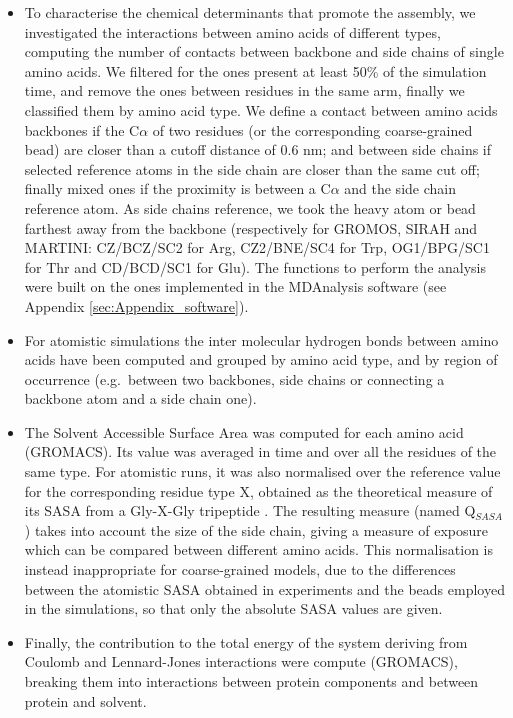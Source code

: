 \begin{itemize}
\item To characterise the chemical determinants that promote the assembly, we investigated the interactions between amino acids of different types, computing the number of contacts between backbone and side chains of single amino acids. We filtered for the ones present at least 50\% of the simulation time, and remove the ones between residues in the same arm, finally we classified them by amino acid type.
%
We define a contact between amino acids backbones if the C$\alpha$ of two residues (or the corresponding coarse-grained bead) are closer than a cutoff distance of 0.6 nm; and between side chains if selected reference atoms in the side chain are closer than the same cut off; finally mixed ones if the proximity is between a C$\alpha$ and the side chain reference atom. As side chains reference, we took the heavy atom or bead farthest away from the backbone (respectively for GROMOS, SIRAH and MARTINI: CZ/BCZ/SC2 for Arg, CZ2/BNE/SC4 for Trp, OG1/BPG/SC1 for Thr and CD/BCD/SC1 for Glu). The functions to perform the analysis were built on the ones implemented in the MDAnalysis software (see Appendix \ref{sec:Appendix_software}).

\item For atomistic simulations the inter molecular hydrogen bonds between amino acids have been computed and grouped by amino acid type, and by region of occurrence (e.g.\ between two backbones, side chains or connecting a backbone atom and a side chain one).

\item The Solvent Accessible Surface Area was computed for each amino acid (GROMACS). Its value was averaged in time and over all the residues of the same type. For atomistic runs, it was also normalised over the reference value for the corresponding residue type X, obtained as the theoretical measure of its SASA from a Gly-X-Gly tripeptide \citep{Tien2013}. The resulting measure (named Q$_{SASA}$) takes into account the size of the side chain, giving a measure of exposure which can be compared between different amino acids. 
%
This normalisation is instead inappropriate for coarse-grained models, due to the differences between the atomistic SASA obtained in experiments and the beads employed in the simulations, so that only the absolute SASA values are given.

\item Finally, the contribution to the total energy of the system deriving from Coulomb and Lennard-Jones interactions were compute (GROMACS), breaking them into interactions between protein components and between protein and solvent.
\end{itemize}

